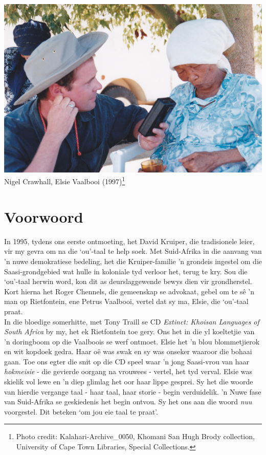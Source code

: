 \begin{center}
\includegraphics[width=.8\textwidth]{vaalbooi.jpg}\\
Nigel Crawhall, Elsie Vaalbooi (1997)\footnote{Photo credit:
Kalahari-Archive\_0050,  \textipa{\textdoublebarpipe}Khomani San
\textipa{\textvertline} Hugh Brody collection,
University of Cape Town Libraries, Special Collections.}
\end{center}

\newpage


\markboth{}{}
\section{Voorwoord}
\markboth{}{}

In 1995, tydens ons eerste ontmoeting, het David Kruiper, die
tradisionele leier, vir my gevra om na die `ou'-taal te help soek. Met
Suid-Afrika in die aanvang van 'n nuwe demokratiese bedeling, het die
Kruiper-familie 'n grondeis ingestel om die Saasi-grondgebied wat
hulle in koloniale tyd verloor het, terug te kry. Sou die `ou'-taal
herwin word, kon dit as deurslaggewende bewys dien vir grondherstel.
Kort hierna het Roger Chennels, die gemeenskap se advokaat, gebel om
te s\^{e} 'n man op Rietfontein, ene Petrus Vaalbooi, vertel dat sy
ma, Elsie, die `ou'-taal praat.\\

In die bloedige somerhitte, met Tony Traill se CD \emph{Extinct:
Khoisan Languages of South Africa} by my, het ek Rietfontein toe gery.
Ons het in die yl koeltetjie van 'n doringboom op die Vaalboois se
werf ontmoet. Elsie het 'n blou blommetjierok en wit kopdoek gedra.
Haar o\"{e} was swak en sy was onseker waaroor die bohaai gaan. Toe
ons egter die snit op die CD speel waar 'n jong Saasi-vrou van haar
\emph{hokmeisie} - die gevierde oorgang na vrouwees - vertel, het tyd
verval.  Elsie was skielik vol lewe en 'n diep glimlag het oor haar
lippe gesprei. Sy het die woorde van hierdie vergange taal - haar
taal, haar storie - begin verduidelik. 'n Nuwe fase van Suid-Afrika se
geskiedenis het begin ontvou. Sy het ons aan die woord
\emph{n\textipa{\textvertline}uu} voorgestel. Dit beteken `om jou eie
taal te praat'.\\

